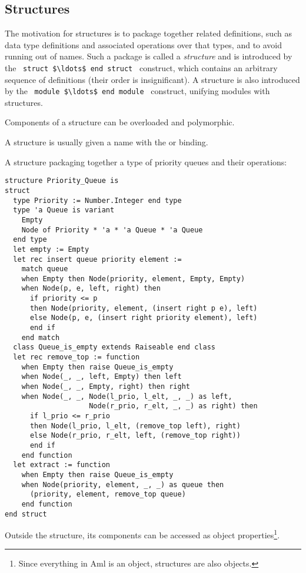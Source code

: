 \subsection{Structures}

The motivation for structures is to package together related definitions, such as data type definitions and associated operations over that types, and to avoid running out of names. Such a package is called a {\em structure} and is introduced by the ~\lstinline!struct $\ldots$ end struct!~ construct, which contains an arbitrary sequence of definitions (their order is insignificant). A structure is also introduced by the ~\lstinline!module $\ldots$ end module!~ construct, unifying modules with structures. 

Components of a structure can be overloaded and polymorphic. 

A structure is usually given a name with the  or  binding. 

\example A structure packaging together a type of priority queues and their operations:
\begin{lstlisting}
structure Priority_Queue is
struct
  type Priority := Number.Integer end type
  type 'a Queue is variant 
    Empty
    Node of Priority * 'a * 'a Queue * 'a Queue
  end type
  let empty := Empty
  let rec insert queue priority element :=
    match queue
    when Empty then Node(priority, element, Empty, Empty)
    when Node(p, e, left, right) then
      if priority <= p
      then Node(priority, element, (insert right p e), left)
      else Node(p, e, (insert right priority element), left)
      end if
    end match
  class Queue_is_empty extends Raiseable end class
  let rec remove_top := function
    when Empty then raise Queue_is_empty
    when Node(_, _, left, Empty) then left
    when Node(_, _, Empty, right) then right
    when Node(_, _, Node(l_prio, l_elt, _, _) as left, 
                    Node(r_prio, r_elt, _, _) as right) then
      if l_prio <= r_prio
      then Node(l_prio, l_elt, (remove_top left), right)
      else Node(r_prio, r_elt, left, (remove_top right))
      end if
    end function
  let extract := function
    when Empty then raise Queue_is_empty
    when Node(priority, element, _, _) as queue then
      (priority, element, remove_top queue)
    end function
end struct
\end{lstlisting}

Outside the structure, its components can be accessed as object properties\footnote{Since everything in Aml is an object, structures are also objects.}. 

